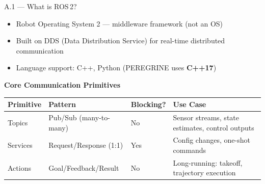 \documentclass[aspectratio=169, 10pt]{beamer}
\begin{document}
\begin{frame}{A.1 --- What is ROS\,2?}
\begin{itemize}
  \item Robot Operating System 2 --- middleware framework (not an OS)
  \item Built on DDS (Data Distribution Service) for real-time distributed communication
  \item Language support: C++, Python (PEREGRINE uses \textbf{C++17})
\end{itemize}

\vspace{0.5em}
\textbf{Core Communication Primitives}

\vspace{0.3em}
\begin{tabularx}{\textwidth}{@{}lllX@{}}
\toprule
\textbf{Primitive} & \textbf{Pattern} & \textbf{Blocking?} & \textbf{Use Case} \\
\midrule
Topics & Pub/Sub (many-to-many) & No & Sensor streams, state estimates, control outputs \\
Services & Request/Response (1:1) & Yes & Config changes, one-shot commands \\
Actions & Goal/Feedback/Result & No & Long-running: takeoff, trajectory execution \\
\bottomrule
\end{tabularx}
\end{frame}
\end{document}
